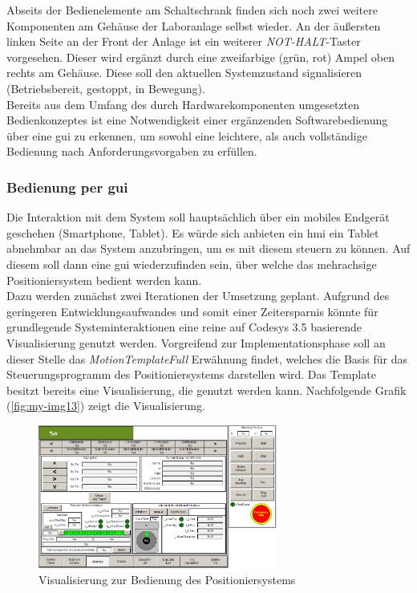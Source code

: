\documentclass[../../../Bachelorarbeit.tex]{subfiles}
\begin{document}
Abseits der Bedienelemente am Schaltschrank finden sich noch zwei weitere Komponenten am Gehäuse der Laboranlage selbst wieder. An der äußersten linken Seite an der Front der Anlage ist ein weiterer \textit{NOT-HALT}-Taster vorgesehen. Dieser wird ergänzt durch eine zweifarbige (grün, rot) Ampel oben rechts am Gehäuse. Diese soll den aktuellen Systemzustand signalisieren (Betriebsbereit, gestoppt, in Bewegung).\\
Bereits aus dem Umfang des durch Hardwarekomponenten umgesetzten Bedienkonzeptes ist eine Notwendigkeit einer ergänzenden Softwarebedienung über eine \acs{gui} zu erkennen, um sowohl eine leichtere, als auch vollständige Bedienung nach Anforderungsvorgaben zu erfüllen.

\subsubsection{Bedienung per \acs{gui}}
Die Interaktion mit dem System soll hauptsächlich über ein mobiles Endgerät geschehen (\zB Smartphone, Tablet). Es würde sich anbieten ein \acs{hmi} \bzw ein Tablet abnehmbar an das System anzubringen, um es mit diesem steuern zu können. Auf diesem soll dann eine \acs{gui} wiederzufinden sein, über welche das mehrachsige Positioniersystem bedient werden kann. \\
Dazu werden zunächst zwei Iterationen der Umsetzung geplant. Aufgrund des geringeren Entwicklungsaufwandes und somit einer Zeitersparnis könnte für grundlegende Systeminteraktionen eine reine auf Codesys 3.5 basierende Visualisierung genutzt werden. Vorgreifend zur Implementationsphase soll an dieser Stelle das \textit{MotionTemplateFull} Erwähnung findet, welches die Basis für das Steuerungsprogramm des Positioniersystems darstellen wird. Das Template besitzt bereits eine Visualisierung, die genutzt werden kann. Nachfolgende Grafik (\autoref{fig:my-img13}) zeigt die Visualisierung.

\begin{figure}[H]
    \centering
    \includegraphics[width=0.7\textwidth]{Images/Visu.PNG}
    \caption[Visualisierung zur Bedienung]{Visualisierung zur Bedienung des Positioniersystems}
    \label{fig:my-img13}
\end{figure}
\end{document}
